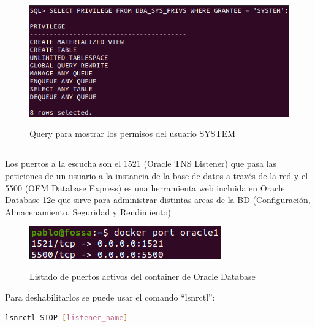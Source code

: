 \documentclass[10pt,a4paper]{article}
\begin{document}
\begin{figure}[h!]
  \centering
  \includegraphics[scale=0.7]{PRIV.png}\\
  \caption{Query para mostrar los permisos del usuario SYSTEM}
  \label{fig:oracle_priv}
\end{figure} 

\pagebreak
\subsection{}
Los puertos a la escucha son el 1521 (Oracle TNS Listener) que pasa las peticiones de un usuario a la instancia de la base de datos a través de la red y el 5500 (OEM Database Express) es una herramienta web incluida en Oracle Database 12c que sirve para administrar distintas areas de la BD (Configuración, Almacenamiento, Seguridad y Rendimiento) \cite{1521} \cite{5500}.

\begin{figure}[h!]
  \centering
  \includegraphics[scale=0.7]{ports.png}\\
  \caption{Listado de puertos activos del container de Oracle Database}
  \label{fig:oracle_ports}
\end{figure} 

Para deshabilitarlos se puede usar el comando ``lsnrctl''\cite{listenerctl}:
\begin{lstlisting}[language=bash]
lsnrctl STOP [listener_name]
\end{lstlisting}
\end{document}
